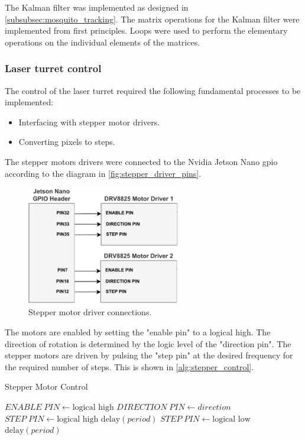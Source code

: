 The Kalman filter was implemented as designed in \autoref{subsubsec:mosquito_tracking}. The matrix operations for the Kalman filter were implemented from first principles. Loops were used to perform the elementary operations on the individual elements of the matrices.

\subsubsection{Laser turret control}
The control of the laser turret required the following fundamental processes to be implemented:
\begin{itemize}
  \item Interfacing with stepper motor drivers.
  \item Converting pixels to steps.
\end{itemize}

The stepper motors drivers were connected to the Nvidia Jetson Nano \gls{gpio} according to the diagram in \autoref{fig:stepper_driver_pins}.
\begin{figure}[!htb]
  \centering
  \includegraphics[width=0.6\textwidth]{figures/stepper_driver_pins.pdf}
  \caption{Stepper motor driver connections.}
  \label{fig:stepper_driver_pins}
\end{figure}
The motors are enabled by setting the "enable pin" to a logical high. The direction of rotation is determined by the logic level of the "direction pin". The stepper motors are driven by pulsing the "step pin" at the desired frequency for the required number of steps. This is shown in \autoref{alg:stepper_control}.
\begin{algorithm}[!htb]
  \caption{Stepper Motor Control}
  \label{alg:stepper_control}
  \begin{algorithmic}[1]
    \State $ENABLE\;PIN \gets \text{logical high}$
    \State $DIRECTION\;PIN \gets direction$
    \State $STEP\;PIN \gets \text{logical high}$
    \State $\text{delay}(period)$
    \State $STEP\;PIN \gets \text{logical low}$
    \State $\text{delay}(period)$
    \EndFor
  \end{algorithmic}
\end{algorithm}


